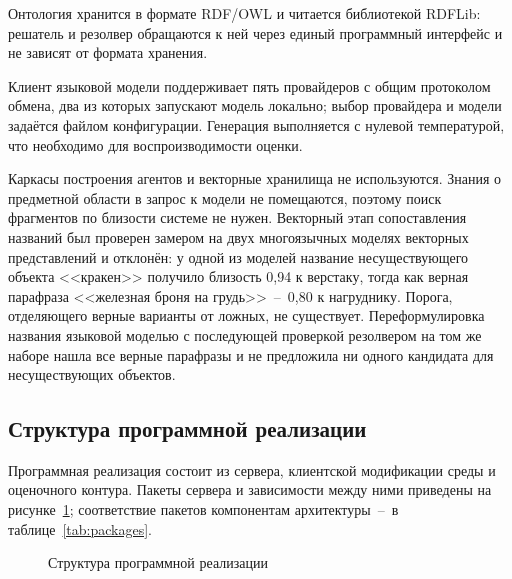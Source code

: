 Онтология хранится в формате RDF/OWL и читается библиотекой RDFLib: решатель и резолвер
обращаются к ней через единый программный интерфейс и не зависят от формата
хранения\cite{Antoniou2012}.

Клиент языковой модели поддерживает пять провайдеров с общим протоколом обмена, два
из которых запускают модель локально; выбор провайдера и модели задаётся файлом
конфигурации. Генерация выполняется с нулевой температурой, что необходимо для
воспроизводимости оценки.

Каркасы построения агентов и векторные хранилища не используются. Знания о предметной
области в запрос к модели не помещаются, поэтому поиск фрагментов по близости системе
не нужен. Векторный этап сопоставления названий был проверен замером на двух многоязычных
моделях векторных представлений и отклонён: у одной из моделей название несуществующего
объекта <<кракен>> получило близость 0,94 к верстаку, тогда как верная парафраза
<<железная броня на грудь>>~--~0,80 к нагруднику. Порога, отделяющего верные варианты от
ложных, не существует. Переформулировка названия языковой моделью с последующей
проверкой резолвером на том же наборе нашла все верные парафразы и не предложила ни
одного кандидата для несуществующих объектов.

\subsection{Структура программной реализации}

Программная реализация состоит из сервера, клиентской модификации среды и оценочного
контура. Пакеты сервера и зависимости между ними приведены на
рисунке~\ref{fig:packages}; соответствие пакетов компонентам архитектуры~--~в
таблице~\ref{tab:packages}.

\begin{figure}[!htb]
  \centering
  
  \caption{Структура программной реализации}
  \label{fig:packages}
\end{figure}

